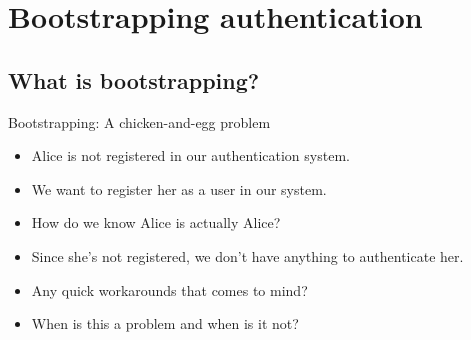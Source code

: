 \mode*




\section[Bootstrapping]{Bootstrapping authentication}

\subsection{What is bootstrapping?}

\begin{frame}
  \begin{block}{Bootstrapping: A chicken-and-egg problem}
    \begin{itemize}
      \item Alice is not registered in our authentication system.
      \item We want to register her as a user in our system.

        \pause{}

      \item How do we know Alice is actually Alice?
      \item Since she's not registered, we don't have anything to authenticate 
        her.
    \end{itemize}
  \end{block}

  \pause{}

  \begin{exercise}
    \begin{itemize}
      \item Any quick workarounds that comes to mind?
      \item When is this a problem and when is it not?
    \end{itemize}
  \end{exercise}
\end{frame}

